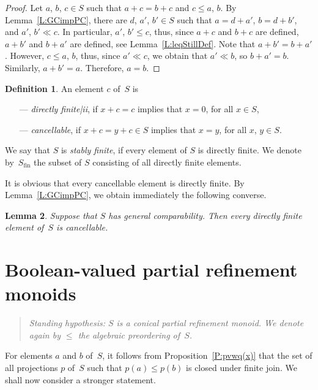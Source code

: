 \documentclass[psamsfonts,reqno]{memo-l}
\theoremstyle{plain}
\newtheorem{lemma}{Lemma}[section]
\theoremstyle{definition}
\newtheorem{definition}[lemma]{Definition}
\theoremstyle{remark}
\numberwithin{equation}{section}
\newcommand{\fin}{\mathrm{fin}}
\newcommand{\prm}{partial refinement mon\-oid}
\begin{document}
\begin{proof}
Let $a$, $b$, $c\in S$ such that $a+c=b+c$ and $c\leq a$, $b$.
By Lemma~\ref{L:GCimpPC}, there are $d$, $a'$, $b'\in S$ such that $a=d+a'$,
$b=d+b'$, and $a'$, $b'\ll c$. In particular, $a'$, $b'\leq c$, thus, since
$a+c$ and $b+c$ are defined, $a+b'$ and $b+a'$ are defined,
see Lemma~\ref{L:leqStillDef}. Note that
$a+b'=b+a'$. However, $c\leq a$, $b$, thus, since $a'\ll c$, we obtain
that $a'\ll b$, so $b+a'=b$. Similarly, $a+b'=a$. Therefore,
$a=b$.
\end{proof}

\begin{definition}\label{D:DirFinMon}
An element $c$ of~$S$ is
\begin{itemize}
\item[---] \emph{directly finite|ii}, if $x+c=c$
implies that $x=0$, for all $x\in S$,

\item[---] \emph{cancellable}, if
$x+c=y+c\in S$ implies that $x=y$, for
all $x$, $y\in S$.
\end{itemize}
We say that $S$ is \emph{stably finite}, if every
element of $S$ is directly finite. We denote
by~$S_\fin$\index{Szzfin@$S_\fin$|ii} the subset of $S$ consisting of all
directly finite elements.
\end{definition}

It is obvious that every cancellable element is
directly finite. By Lemma~\ref{L:GCimpPC}, we obtain immediately the
following converse.

\begin{lemma}\label{L:DfimCanc}
Suppose that $S$ has general comparability. Then every directly finite
element of~$S$ is cancellable.
\end{lemma}

\section{Boolean-valued partial refinement monoids}\label{S:BoolValPRM}
\begin{quote}
\em Standing hypothesis: $S$ is a conical \prm. We denote again by $\leq$ the
algebraic preordering of~$S$.
\end{quote}

For elements $a$ and $b$ of~$S$, it follows from Proposition~\ref{P:pvwq(x)}
that the set of all projections $p$ of~$S$ such that $p(a)\leq p(b)$ is
closed under finite join. We shall now consider a stronger statement.
\end{document}
